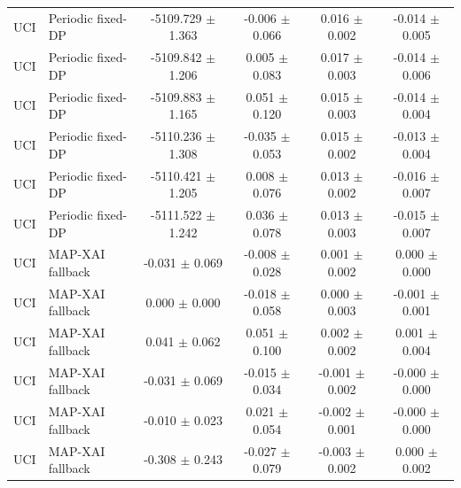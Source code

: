 \begin{table}[t]
\begin{tabular}{llcccc}
UCI & Periodic fixed-DP & -5109.729 $\pm$ 1.363 & -0.006 $\pm$ 0.066 & 0.016 $\pm$ 0.002 & -0.014 $\pm$ 0.005 \\
UCI & Periodic fixed-DP & -5109.842 $\pm$ 1.206 & 0.005 $\pm$ 0.083 & 0.017 $\pm$ 0.003 & -0.014 $\pm$ 0.006 \\
UCI & Periodic fixed-DP & -5109.883 $\pm$ 1.165 & 0.051 $\pm$ 0.120 & 0.015 $\pm$ 0.003 & -0.014 $\pm$ 0.004 \\
UCI & Periodic fixed-DP & -5110.236 $\pm$ 1.308 & -0.035 $\pm$ 0.053 & 0.015 $\pm$ 0.002 & -0.013 $\pm$ 0.004 \\
UCI & Periodic fixed-DP & -5110.421 $\pm$ 1.205 & 0.008 $\pm$ 0.076 & 0.013 $\pm$ 0.002 & -0.016 $\pm$ 0.007 \\
UCI & Periodic fixed-DP & -5111.522 $\pm$ 1.242 & 0.036 $\pm$ 0.078 & 0.013 $\pm$ 0.003 & -0.015 $\pm$ 0.007 \\
UCI & MAP-XAI fallback & -0.031 $\pm$ 0.069 & -0.008 $\pm$ 0.028 & 0.001 $\pm$ 0.002 & 0.000 $\pm$ 0.000 \\
UCI & MAP-XAI fallback & 0.000 $\pm$ 0.000 & -0.018 $\pm$ 0.058 & 0.000 $\pm$ 0.003 & -0.001 $\pm$ 0.001 \\
UCI & MAP-XAI fallback & 0.041 $\pm$ 0.062 & 0.051 $\pm$ 0.100 & 0.002 $\pm$ 0.002 & 0.001 $\pm$ 0.004 \\
UCI & MAP-XAI fallback & -0.031 $\pm$ 0.069 & -0.015 $\pm$ 0.034 & -0.001 $\pm$ 0.002 & -0.000 $\pm$ 0.000 \\
UCI & MAP-XAI fallback & -0.010 $\pm$ 0.023 & 0.021 $\pm$ 0.054 & -0.002 $\pm$ 0.001 & -0.000 $\pm$ 0.000 \\
UCI & MAP-XAI fallback & -0.308 $\pm$ 0.243 & -0.027 $\pm$ 0.079 & -0.003 $\pm$ 0.002 & 0.000 $\pm$ 0.002 \\
\bottomrule
\end{tabular}
\end{table}
